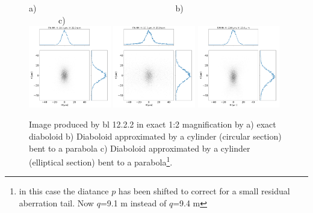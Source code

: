 \documentclass{iucr}              %
\newcommand{\inred}[1]{{\color{red}#1}}
\begin{document}
\begin{figure}\label{fig:finalcomparison}
\flushleft
a)~~~~~~~~~~~~~~~~~~~~~~~~~~~~~~~~~b)~~~~~~~~~~~~~~~~~~~~~~~~~~~~~~c)\\
\centering
\includegraphics[width=0.32\textwidth]{figures/final_exact.png} 
\includegraphics[width=0.32\textwidth]{figures/final_approx1.png} 
\includegraphics[width=0.32\textwidth]{figures/final_approx2corrected.png} 

\caption{ Image produced by bl 12.2.2 in exact 1:2 magnification by 
a) exact diaboloid b) Diaboloid approximated by a cylinder (circular section) bent to a parabola c) Diaboloid approximated by a cylinder (elliptical section) bent to a parabola\footnote{in this case the diatance $p$ has been shifted to correct for a small residual aberration tail. Now $q$=9.1 m instead of $q$=9.4 m}. 
}
\end{figure}


\end{document}
